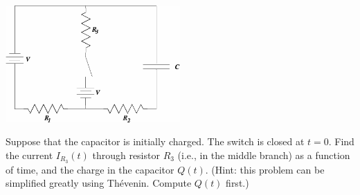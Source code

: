 \documentclass[makesolutionspdf]{esg8022pset}
\begin{document}
\begin{problem}{}
  \begin{center}\includegraphics[width=0.5\textwidth]{ps07_07}\end{center}
  Suppose that the capacitor is initially charged.  The switch is closed at $t = 0$.  Find the current $I_{R_3}(t)$ through resistor $R_3$ (i.e., in the middle branch) as a function of time, and the charge in the capacitor $Q(t)$.  (Hint: this problem can be simplified greatly using Th\'evenin.  Compute $Q(t)$ first.)
\end{problem}
\end{document}
